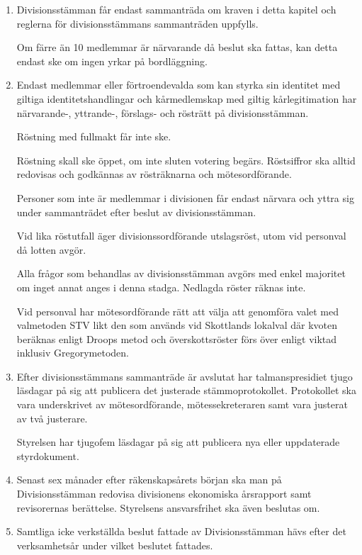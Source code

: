 \documentclass{dvd}
\begin{document}
\begin{enumerate}[label=\arabic* §, ref=\arabic*]
		\item Divisionsstämman får endast sammanträda om kraven i detta kapitel och reglerna för divisionsstämmans sammanträden uppfylls.

		Om färre än 10 medlemmar är närvarande då beslut ska fattas, kan detta endast ske om ingen yrkar på bordläggning.

		\item Endast medlemmar eller förtroendevalda som kan styrka sin identitet med giltiga identitetshandlingar och kårmedlemskap med giltig kårlegitimation har närvarande-, yttrande-, förslags- och rösträtt på divisionsstämman.

		Röstning med fullmakt får inte ske.

		Röstning skall ske öppet, om inte sluten votering begärs.
		Röstsiffror ska alltid redovisas och godkännas av rösträknarna och mötesordförande.

		Personer som inte är medlemmar i divisionen får endast närvara och yttra sig under sammanträdet efter beslut av divisionsstämman.

		Vid lika röstutfall äger divisionssordförande utslagsröst, utom vid personval då lotten avgör.

		Alla frågor som behandlas av divisionsstämman avgörs med enkel majoritet om inget annat anges i denna stadga.
		Nedlagda röster räknas inte.

		Vid personval har mötesordförande rätt att välja att genomföra valet med valmetoden STV likt den som används vid Skottlands lokalval där kvoten beräknas enligt Droops metod och överskottsröster förs över enligt viktad inklusiv Gregorymetoden.

		\item Efter divisionsstämmans sammanträde är avslutat har talmanspresidiet tjugo läsdagar på sig att publicera det justerade stämmoprotokollet.
		Protokollet ska vara underskrivet av mötesordförande, mötessekreteraren samt vara justerat av två justerare.

		Styrelsen har tjugofem läsdagar på sig att publicera nya eller uppdaterade styrdokument.

		\item Senast sex månader efter räkenskapsårets början ska man på Divisionsstämman redovisa divisionens ekonomiska årsrapport samt revisorernas berättelse.
		Styrelsens ansvarsfrihet ska även beslutas om.

                \item Samtliga icke verkställda beslut fattade av Divisionsstämman hävs efter det verksamhetsår under vilket beslutet fattades.
	\end{enumerate}
\end{document}
